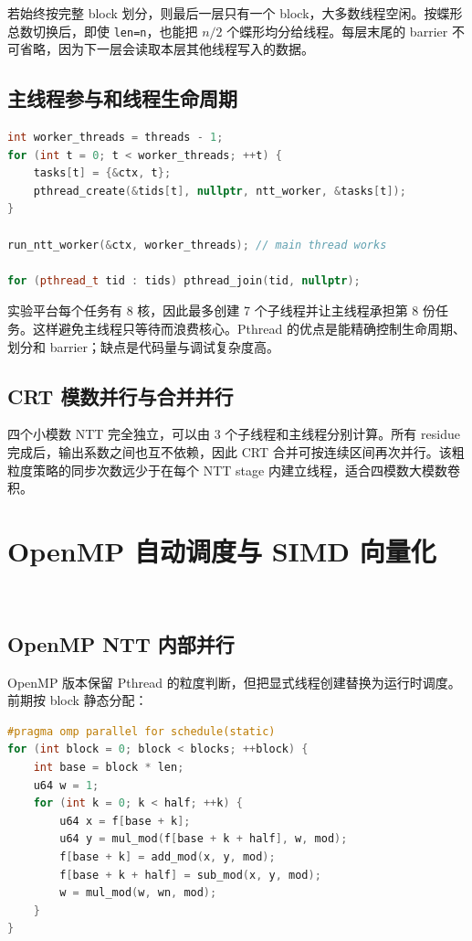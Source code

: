 若始终按完整 block 划分，则最后一层只有一个 block，大多数线程空闲。按蝶形总数切换后，即使 \texttt{len=n}，也能把 $n/2$ 个蝶形均分给线程。每层末尾的 barrier 不可省略，因为下一层会读取本层其他线程写入的数据。

\subsection{主线程参与和线程生命周期}

\begin{lstlisting}[title=创建子线程并让主线程参与,label={lst:pthread-create},language={C++}]
int worker_threads = threads - 1;
for (int t = 0; t < worker_threads; ++t) {
    tasks[t] = {&ctx, t};
    pthread_create(&tids[t], nullptr, ntt_worker, &tasks[t]);
}

run_ntt_worker(&ctx, worker_threads); // main thread works

for (pthread_t tid : tids) pthread_join(tid, nullptr);
\end{lstlisting}

实验平台每个任务有 8 核，因此最多创建 7 个子线程并让主线程承担第 8 份任务。这样避免主线程只等待而浪费核心。Pthread 的优点是能精确控制生命周期、划分和 barrier；缺点是代码量与调试复杂度高。

\subsection{CRT 模数并行与合并并行}

四个小模数 NTT 完全独立，可以由 3 个子线程和主线程分别计算。所有 residue 完成后，输出系数之间也互不依赖，因此 CRT 合并可按连续区间再次并行。该粗粒度策略的同步次数远少于在每个 NTT stage 内建立线程，适合四模数大模数卷积。

\section{OpenMP 自动调度与 SIMD 向量化}\oldwork\ \fusionwork

\subsection{OpenMP NTT 内部并行}

OpenMP 版本保留 Pthread 的粒度判断，但把显式线程创建替换为运行时调度。前期按 block 静态分配：

\begin{lstlisting}[title=OpenMP按block静态调度,label={lst:omp-block},language={C++}]
#pragma omp parallel for schedule(static)
for (int block = 0; block < blocks; ++block) {
    int base = block * len;
    u64 w = 1;
    for (int k = 0; k < half; ++k) {
        u64 x = f[base + k];
        u64 y = mul_mod(f[base + k + half], w, mod);
        f[base + k] = add_mod(x, y, mod);
        f[base + k + half] = sub_mod(x, y, mod);
        w = mul_mod(w, wn, mod);
    }
}
\end{lstlisting}

